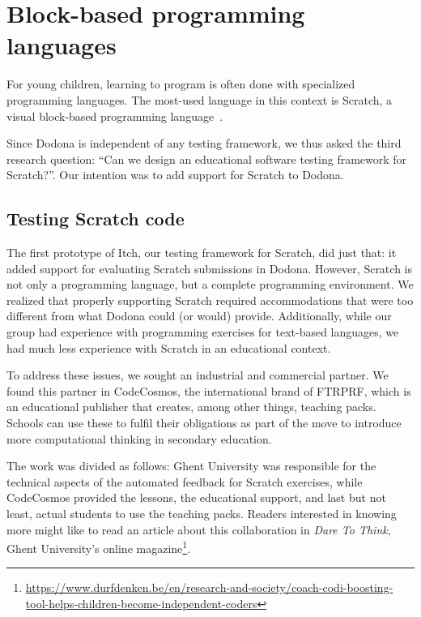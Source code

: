 \documentclass[../main]{subfiles}
\begin{document}
\section{Block-based programming languages}\label{sec:the-second-part:-scratch}

For young children, learning to program is often done with specialized programming languages.
The most-used language in this context is Scratch, a visual block-based programming language~\autocite{resnickScratchProgrammingAll2009}.

Since Dodona is independent of any testing framework, we thus asked the third research question: ``Can we design an educational software testing framework for Scratch?''.
Our intention was to add support for Scratch to Dodona.

\subsection{Testing Scratch code}\label{subsec:testing-scrath-code}

The first prototype of Itch, our testing framework for Scratch, did just that: it added support for evaluating Scratch submissions in Dodona.
However, Scratch is not only a programming language, but a complete programming environment.
We realized that properly supporting Scratch required accommodations that were too different from what Dodona could (or would) provide.
Additionally, while our group had experience with programming exercises for text-based languages, we had much less experience with Scratch in an educational context.

To address these issues, we sought an industrial and commercial partner.
We found this partner in CodeCosmos, the international brand of FTRPRF, which is an educational publisher that creates, among other things, teaching packs.
Schools can use these to fulfil their obligations as part of the move to introduce more computational thinking in secondary education.

The work was divided as follows: Ghent University was responsible for the technical aspects of the automated feedback for Scratch exercises, while CodeCosmos provided the lessons, the educational support, and last but not least, actual students to use the teaching packs.
Readers interested in knowing more might like to read an article about this collaboration in \textit{Dare To Think}, Ghent University's online magazine\footnote{\url{https://www.durfdenken.be/en/research-and-society/coach-codi-boosting-tool-helps-children-become-independent-coders}}.
\end{document}
